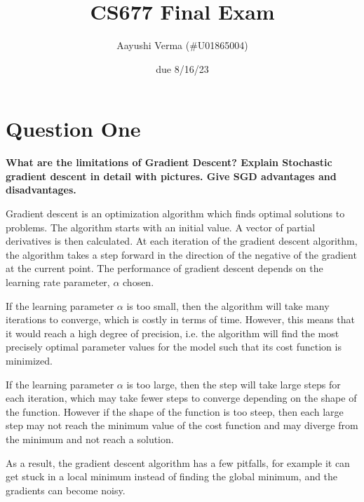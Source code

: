 \documentclass{article}
\title{CS677 Final Exam}
\author{Aayushi Verma (\#U01865004)}
\date{due 8/16/23}
\begin{document}
\maketitle

\section{Question One}
\noindent \textbf{What are the limitations of Gradient Descent? Explain Stochastic gradient descent in detail with pictures. Give SGD advantages and disadvantages.}


Gradient descent is an optimization algorithm which finds optimal solutions to problems. The algorithm starts with an initial value. A vector of partial derivatives is then calculated. At each iteration of the gradient descent algorithm, the algorithm takes a step forward in the direction of the negative of the gradient at the current point. The performance of gradient descent depends on the learning rate parameter, $\alpha$ chosen.

If the learning parameter $\alpha$ is too small, then the algorithm will take many iterations to converge, which is costly in terms of time. However, this means that it would reach a high degree of precision, i.e. the algorithm will find the most precisely optimal parameter values for the model such that its cost function is minimized.

If the learning parameter $\alpha$ is too large, then the step will take large steps for each iteration, which may take fewer steps to converge depending on the shape of the function. However if the shape of the function is too steep, then each large step may not reach the minimum value of the cost function and may diverge from the minimum and not reach a solution.

As a result, the gradient descent algorithm has a few pitfalls, for example it can get stuck in a local minimum instead of finding the global minimum, and the gradients can become noisy.
\end{document}
